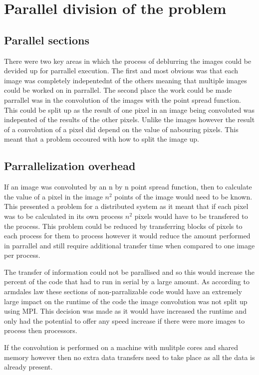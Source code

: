 \section{Parallel division of the problem}

\subsection{Parallel sections}
There were two key areas in which the process of deblurring the images could be devided up for parrallel execution. The first and most obvious was that each image was completely indepentednt of the others meaning that multiple images could be worked on in parrallel. The second place the work could be made parrallel was in the convolution of the images with the point spread function. This could be split up as the result of one pixel in an image being convoluted was indepented of the results of the other pixels. Unlike the images however the result of a convolution of a pixel did depend on the value of nabouring pixels. This meant that a problem occoured with how to split the image up.

\subsection{Parrallelization overhead}
If an image was convoluted by an n by n point spread function, then to calculate the value of a pixel in the image \(n^2\) points of the image would need to be known. This presented a problem for a distributed system as it meant that if each pixel was to be calculated in its own process \(n^2\) pixels would have to be transfered to the process. This problem could be reduced by transferring blocks of pixels to each process for them to process however it would reduce the amount performed in parrallel and still require additional transfer time when compared to one image per process.

The transfer of information could not be parallised and so this would increase the percent of the code that had to run in serial by a large amount. As according to armdales law these sections of non-parralizable code would have an extremely large impact on the runtime of the code the image convolution was not split up using MPI. This decision was made as it would have increased the runtime and only had the potential to offer any speed increase if there were more images to process then processors.

If the convolution is performed on a machine with mulitple cores and shared memory however then no extra data transfers need to take place as all the data is already present.